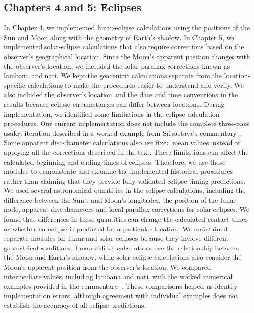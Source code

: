 \documentclass[12pt,a4paper,oneside]{report}
\begin{document}
\subsection{Chapters 4 and 5: Eclipses}

In Chapter 4, we implemented lunar-eclipse calculations using the positions of the Sun and Moon along with the geometry of Earth's shadow. In Chapter 5, we implemented solar-eclipse calculations that also require corrections based on the observer's geographical location. Since the Moon's apparent position changes with the observer's location, we included the solar parallax corrections known as lambana and nati. We kept the geocentric calculations separate from the location-specific calculations to make the procedures easier to understand and verify. We also included the observer's location and the date and time conventions in the results because eclipse circumstances can differ between locations. During implementation, we identified some limitations in the eclipse calculation procedures. Our current implementation does not include the complete three-pass asakṛt iteration described in a worked example from Srivastava's commentary~\cite{shrivastava}. Some apparent disc-diameter calculations also use fixed mean values instead of applying all the corrections described in the text. These limitations can affect the calculated beginning and ending times of eclipses. Therefore, we use these modules to demonstrate and examine the implemented historical procedures rather than claiming that they provide fully validated eclipse timing predictions. We used several astronomical quantities in the eclipse calculations, including the difference between the Sun's and Moon's longitudes, the position of the lunar node, apparent disc diameters and local parallax corrections for solar eclipses. We found that differences in these quantities can change the calculated contact times or whether an eclipse is predicted for a particular location. We maintained separate modules for lunar and solar eclipses because they involve different geometrical conditions. Lunar-eclipse calculations use the relationship between the Moon and Earth's shadow, while solar-eclipse calculations also consider the Moon's apparent position from the observer's location. We compared intermediate values, including lambana and nati, with the worked numerical examples provided in the commentary~\cite{shrivastava}. These comparisons helped us identify implementation errors, although agreement with individual examples does not establish the accuracy of all eclipse predictions.
\end{document}
